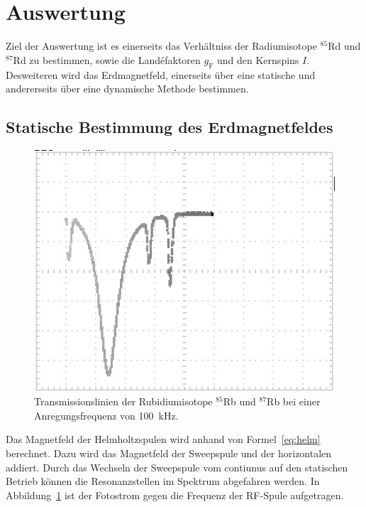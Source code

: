 \section{Auswertung}%
\label{sec:auswertung}

Ziel der Auswertung ist es einerseits das Verhältniss der Radiumisotope
$^{85}$Rd und $^{87}$Rd zu bestimmen, sowie die Land\'efaktoren $g_\text{F}$ und
den Kernspins $I$.
Desweiteren wird das Erdmagnetfeld, einerseits über eine statische 
und andererseits über eine dynamische Methode bestimmen.
\subsection{Statische Bestimmung des Erdmagnetfeldes}%
\label{sub:statische_bestimmung_des_erdmagnetfeldes}
\begin{figure}
	\centering
	\includegraphics[width=\linewidth]{picture/Transmission_Spek_cut.JPG}
	\caption{Transmissionslinien der Rubidiumisotope $^{85}$Rb und $^{87}$Rb bei
	einer Anregungsfrequenz von \SI{100}{\kilo\hertz}.}
	\label{fig:transmission}
\end{figure}
Das Magnetfeld der Helmholtzspulen wird anhand von Formel~\ref{eq:helm}
berechnet. 
Dazu wird das Magnetfeld der Sweepspule und der horizontalen addiert. 
Durch das Wechseln der Sweepspule vom contiunus auf den statischen Betrieb
können die Resonanzstellen im Spektrum abgefahren werden.
In Abbildung~\ref{fig:transmission} ist der Fotostrom gegen die Frequenz der
RF-Spule aufgetragen. 


